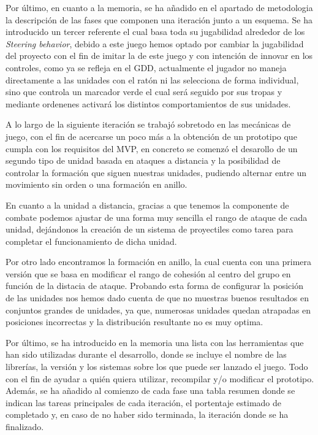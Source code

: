 Por último, en cuanto a la memoria, se ha añadido en el apartado de metodologia la
descripción de las fases que componen una iteración junto a un esquema. Se ha introducido
un tercer referente el cual basa toda su jugabilidad alrededor de los \textit{Steering
behavior}, debido a este juego hemos optado por cambiar la jugabilidad del proyecto
con el fin de imitar la de este juego y con intención de innovar en los controles, como ya se
refleja en el \ac{GDD}, actualmente el jugador no maneja directamente a las unidades con el
ratón ni las selecciona de forma individual, sino que controla un marcador verde el cual será
seguido por sus tropas y mediante ordenenes activará los distintos comportamientos de sus 
unidades. 

A lo largo de la siguiente iteración se trabajó sobretodo en las mecánicas de juego, con el fin
de acercarse un poco más a la obtención de un prototipo que cumpla con los requisitos del \acs{MVP},
en concreto se comenzó el desarollo de un segundo tipo de unidad basada en ataques a distancia y 
la posibilidad de controlar la formación que siguen nuestras unidades, pudiendo alternar entre un
movimiento sin orden o una formación en anillo.

En cuanto a la unidad a distancia, gracias a que tenemos la componente de combate podemos ajustar de una
forma muy sencilla el rango de ataque de cada unidad, dejándonos la creación de un sistema de proyectiles
como tarea para completar el funcionamiento de dicha unidad. 

Por otro lado encontramos la formación en anillo, la cual cuenta con una primera versión que se basa en
modificar el rango de cohesión al centro del grupo en función de la distacia de ataque. Probando esta forma 
de configurar la posición de las unidades nos hemos dado cuenta de que no muestras buenos resultados en
conjuntos grandes de unidades, ya que, numerosas unidades quedan atrapadas en posiciones incorrectas y la
distribución resultante no es muy optima.


Por último, se ha introducido en la memoria una lista con las herramientas que han sido utilizadas 
durante el desarrollo, donde se incluye el nombre de las librerías, la versión y los sistemas sobre los que
puede ser lanzado el juego. Todo con el fin de ayudar a quién quiera utilizar, recompilar y/o 
modificar el prototipo. Además, se ha añadido al comienzo de cada fase una tabla resumen donde se indican
las tareas principales de cada iteración, el portentaje estimado de completado y, en caso de no haber sido
terminada, la iteración donde se ha finalizado.


